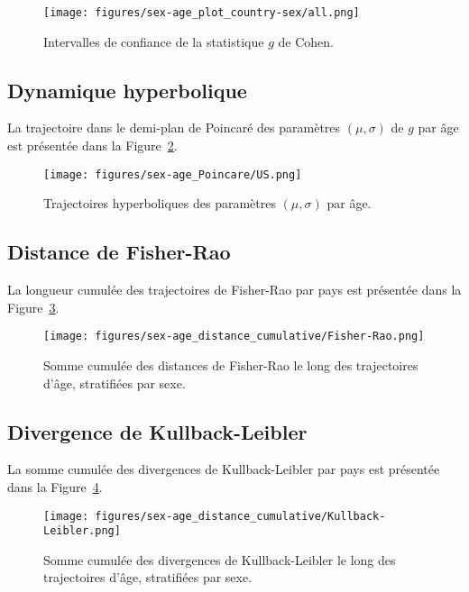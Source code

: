 \begin{figure}[H]
	\centering
	\texttt{[image: figures/sex-age\_plot\_country-sex/all.png]}
	\caption{Intervalles de confiance de la statistique \(g\) de Cohen.}
	\label{fig:sex-age_plot_country-sex}
\end{figure}

\subsection{Dynamique hyperbolique}

La trajectoire dans le demi-plan de Poincaré des paramètres \((\mu, \sigma)\) de \(g\) par âge est présentée dans la Figure~\ref{fig:sex-age_Poincare-US}.

\begin{figure}[H]
	\centering
	\texttt{[image: figures/sex-age\_Poincare/US.png]}
	\caption{Trajectoires hyperboliques des paramètres \((\mu, \sigma)\) par âge.}
	\label{fig:sex-age_Poincare-US}
\end{figure}

\subsection{Distance de Fisher-Rao}

La longueur cumulée des trajectoires de Fisher-Rao par pays est présentée dans la Figure~\ref{fig:sex-age_distance_cumulative-Fisher-Rao}.

\begin{figure}[H]
	\centering
	\texttt{[image: figures/sex-age\_distance\_cumulative/Fisher-Rao.png]}
	\caption{Somme cumulée des distances de Fisher-Rao le long des trajectoires d'âge, stratifiées par sexe.}
	\label{fig:sex-age_distance_cumulative-Fisher-Rao}
\end{figure}

\subsection{Divergence de Kullback-Leibler}

La somme cumulée des divergences de Kullback-Leibler par pays est présentée dans la Figure~\ref{fig:sex-age_distance_cumulative-Kullback-Leibler}.

\begin{figure}[H]
	\centering
	\texttt{[image: figures/sex-age\_distance\_cumulative/Kullback-Leibler.png]}
	\caption{Somme cumulée des divergences de Kullback-Leibler le long des trajectoires d'âge, stratifiées par sexe.}
	\label{fig:sex-age_distance_cumulative-Kullback-Leibler}
\end{figure}

